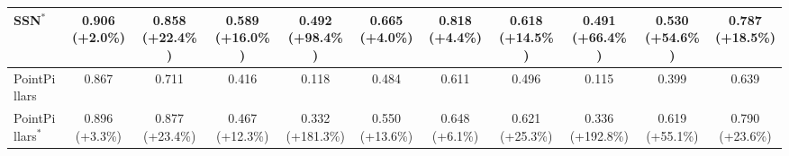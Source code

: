 \begin{table}[htpb]
\begin{tabular}{lcccccccccc}
    SSN$^*$ & 0.906 (+2.0\%) & 0.858 (+22.4\%) & 0.589 (+16.0\%) & 0.492 (+98.4\%) & 0.665 (+4.0\%) & 0.818 (+4.4\%) & 0.618 (+14.5\%) & 0.491 (+66.4\%) & 0.530 (+54.6\%) & 0.787 (+18.5\%) \\
    \midrule
    PointPillars & 0.867 & 0.711 & 0.416 & 0.118 & 0.484 & 0.611 & 0.496 & 0.115 & 0.399 & 0.639 \\
    PointPillars$^*$ & 0.896 (+3.3\%) & 0.877 (+23.4\%) & 0.467 (+12.3\%) & 0.332 (+181.3\%) & 0.550 (+13.6\%) & 0.648 (+6.1\%) & 0.621 (+25.3\%) & 0.336 (+192.8\%) & 0.619 (+55.1\%) & 0.790 (+23.6\%) \\
    \bottomrule
    \end{tabular}
    \label{tab:ap_results_4.0}
\end{table}
